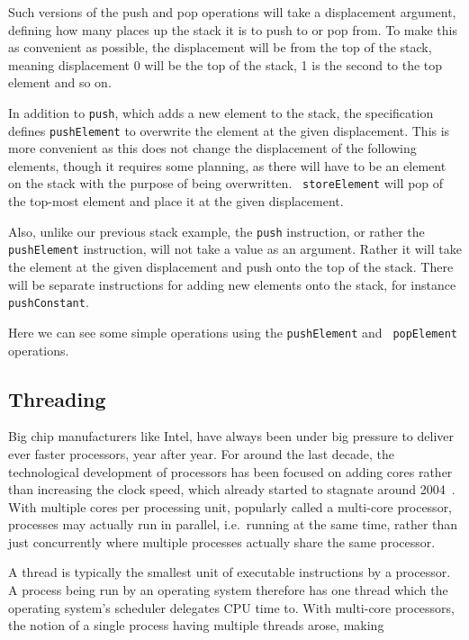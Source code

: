 Such versions of the push and pop operations will take a displacement argument,
defining how many places up the stack it is to push to or pop from. To make this
as convenient as possible, the displacement will be from the top of the stack,
meaning displacement 0 will be the top of the stack, 1 is the second to the top
element and so on.

In addition to {\tt push}, which adds a new element to the stack, the
specification defines {\tt pushElement} to overwrite the element at the given
displacement. This is more convenient as this does not change the displacement
of the following elements, though it requires some planning, as there will have
to be an element on the stack with the purpose of being overwritten. {\tt
  storeElement} will pop of the top-most element and place it at the given
displacement. %

Also, unlike our previous stack example, the {\tt push} instruction, or rather
the {\tt pushElement} instruction, will not take a value as an argument. Rather
it will take the element at the given displacement and push onto the top of the
stack. There will be separate instructions for adding new elements onto the
stack, for instance {\tt pushConstant}.

Here we can see some simple operations using the {\tt pushElement} and {\tt
  popElement} operations.
\begin{stackops}
\end{stackops}


\subsection{Threading}
\label{sec:design:threading}

Big chip manufacturers like Intel, have always been under big pressure to
deliver ever faster processors, year after year. For around the last decade, the
technological development of processors has been focused on adding cores rather
than increasing the clock speed, which already started to stagnate around
2004~\cite{sutter}. With multiple cores per processing unit, popularly called a
multi-core processor, processes may actually run in parallel, i.e.~running at
the same time, rather than just concurrently where multiple processes actually
share the same processor.

A thread is typically the smallest unit of executable instructions by a
processor. A process being run by an operating system therefore has one thread
which the operating system's scheduler delegates CPU time to. With multi-core
processors, the notion of a single process having multiple threads arose,
making %

